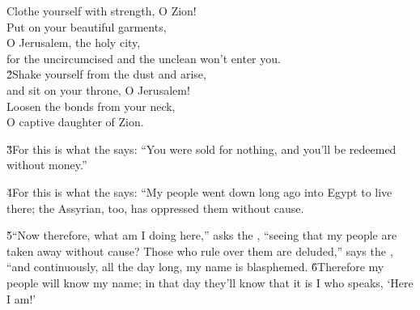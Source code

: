 \begin{poetry}
\poemll    Clothe yourself with strength, O Zion! \\
\poeml Put on your beautiful garments, \\
\poemll    O Jerusalem, the holy city, \\
\poemlll       for the uncircumcised and the unclean won't enter you. \\
\poeml \v{2}Shake yourself from the dust and arise, \\
\poemll    and sit on your throne, O Jerusalem! \\
\poeml Loosen the bonds from your neck, \\
\poemll    O captive daughter of Zion.
\end{poetry}

\v{3}For this is what the  says: ``You were sold for nothing, and you'll be redeemed without money.''

\v{4}For this is what the  says: ``My people went down long ago into Egypt to live there; the Assyrian, too, has oppressed them without cause.

\v{5}``Now therefore, what am I doing here,'' asks the , ``seeing that my people are taken away without cause? Those who rule over them are deluded,'' says the , ``and continuously, all the day long, my name is blasphemed. \v{6}Therefore my people will know my name; in that day they'll know that it is I who speaks, `Here I am!'

